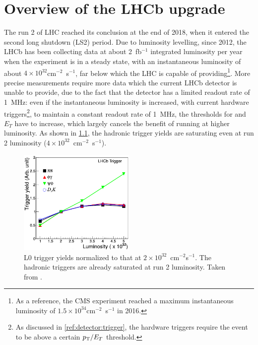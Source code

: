 \chapter{Overview of the LHCb upgrade}
\label{ref:lhcb-upgrade-overview}

The run 2 of LHC reached its conclusion at the end of 2018,
when it entered the second long shutdown (LS2) period.
Due to luminosity levelling, since 2012,
the LHCb has been collecting data at about 2~fb$^{-1}$ integrated luminosity per
year when the experiment is in a steady state,
with an instantaneous luminosity of about $4 \times 10^{32}$cm$^{-2}$~s$^{-1}$,
far below which the LHC is capable of providing\footnote{
    As a reference, the CMS experiment reached a maximum instantaneous
    luminosity of $1.5 \times 10^{34}$cm$^{-2}$~s$^{-1}$ in 2016.
}.
More precise measurements require more data which the current LHCb detector is
unable to provide,
due to the fact that the detector has a limited readout rate of 1~MHz:
even if the instantaneous luminosity is increased,
with current hardware triggers\footnote{
    As discussed in \cref{ref:detector:trigger},
    the hardware triggers require the event to be above a certain $p_{\mathrm{T}} / E_T$
    threshold.
},
to maintain a constant readout rate of 1~MHz,
the thresholds for \pt and $E_T$ have to increase,
which largely cancels the benefit of running at higher luminosity.
As shown in \cref{fig:l0-trigger-eff},
the hadronic trigger yields are saturating even at run 2 luminosity
($4 \times 10^{32}$~cm$^{-2}$~s$^{-1}$).

\begin{figure}[!htb]
    \centering
    \includegraphics[width=0.5\textwidth]{./figs-lhcb-upgrade-overview/trigger_efficiency.pdf}
    \caption{
        L0 trigger yields normalized to that at
        $2 \times 10^{32}$~cm$^{-2}$s$^{-1}$.
        The hadronic triggers are already saturated at run 2 luminosity.
        Taken from \cite{CERN-LHCC-2011-001}.
    }
    \label{fig:l0-trigger-eff}
\end{figure}

